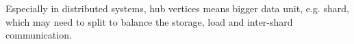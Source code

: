 
Especially in distributed systems, hub vertices means bigger data unit, e.g.
shard, which may need to split to balance the storage, load and inter-shard
communication.


